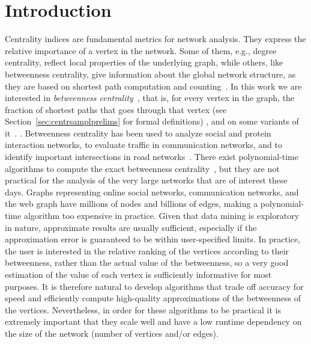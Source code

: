 \section{Introduction}\label{sec:centrsamplintro}
Centrality indices are fundamental metrics for network analysis. They express the
relative importance of a vertex in the network. Some of them, e.g., degree
centrality, reflect local properties of the underlying graph, while others,
like betweenness centrality, give information about the global network
structure, as they are based on shortest path computation and counting~\citep{Newman10}. In
this work we are interested in \emph{betweenness
centrality}~\citep{Anthonisse71,Freeman77}, that is, for every vertex in the
graph, the fraction of shortest paths that goes through that vertex (see
Section~\ref{sec:centrsamplprelims} for formal definitions)
\ifproof
, and on some variants of it~\citep{OpsahlAS10,BorgattiE06,Brandes08}. %
\else
. %
\fi
Betweenness centrality has been used to analyze social and protein interaction
networks, to evaluate traffic in communication networks, and to identify
important intersections in road networks~\citep{Newman10,GeisbergerSS08}. There
exist polynomial-time algorithms to compute the exact betweenness
centrality~\citep{Brandes01}, but they are not practical for the analysis of the
very large networks that are of interest these days. Graphs representing online
social networks, communication networks, and the web graph have millions of
nodes and billions of edges, making a polynomial-time algorithm too expensive in
practice. Given that data mining is exploratory in nature, approximate results
are usually sufficient, especially if the approximation error is guaranteed to
be within user-specified limits. In practice, the user is interested in the
relative ranking of the vertices according to their betweenness, rather than the
actual value of the betweenness, so a very good estimation of the value of each
vertex is sufficiently informative for most purposes. It is therefore natural to
develop algorithms that trade off accuracy for speed and efficiently compute
high-quality approximations of the betweenness of the vertices.  Nevertheless,
in order for these algorithms to be practical it is extremely important that
they scale well and have a low runtime dependency on the size of the network
(number of vertices and/or edges).

